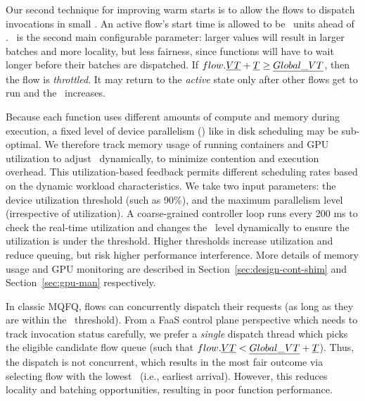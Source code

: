 Our second technique for improving warm starts is to allow the flows to dispatch invocations in small .
An active flow's start time is allowed to be \T~units ahead of \GlobVT.
\T~is the second main configurable parameter: larger values will result in larger batches and more locality, but less fairness, since functions will have to wait longer before their batches are dispatched.
If $flow.\emph{VT} + \emph{T} \ge \emph{Global\_VT}$, then the flow is \emph{throttled}.
It may return to the \emph{active} state only after other flows get to run and the \GlobVT~increases. 


Because each function uses different amounts of compute and memory during execution, a fixed level of device parallelism (\D) like in disk scheduling may be sub-optimal.
We therefore track memory usage of running containers and GPU utilization to adjust \D~dynamically, to minimize contention and execution overhead.
This utilization-based feedback permits different scheduling rates based on the dynamic workload characteristics.
We take two input parameters: the device utilization threshold (such as 90\%), and the maximum parallelism level (irrespective of utilization).
A coarse-grained controller loop runs every 200 ms to check the real-time utilization and changes the \D~level dynamically to ensure the utilization is under the threshold.
Higher thresholds increase utilization and reduce queuing, but risk higher performance interference. 
More details of memory usage and GPU monitoring are described in Section~\ref{sec:design-cont-shim} and Section~\ref{sec:gpu-man} respectively. 

In classic MQFQ, flows can concurrently dispatch their requests (as long as they are within the \T~threshold).
From a FaaS control plane perspective which needs to track invocation status carefully, we prefer a \emph{single} dispatch thread which picks the eligible candidate flow queue (such that $flow.\emph{VT} < \emph{Global\_VT} + \emph{T}$).
Thus, the dispatch is not concurrent, which results in the most fair outcome via selecting flow with the lowest \VT~(i.e., earliest arrival).
However, this reduces locality and batching opportunities, resulting in poor function performance.

